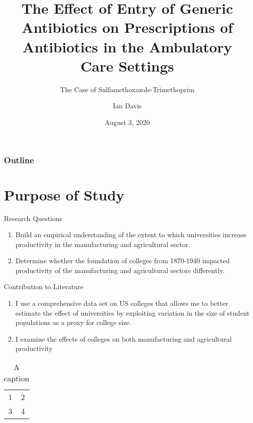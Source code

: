 \documentclass{beamer}
\title{The Effect of Entry of Generic Antibiotics on Prescriptions of Antibiotics in the Ambulatory Care Settings}
\subtitle{The Case of Sulfamethoxazole-Trimethoprim}
\author{Ian Davis}
\institute{Clemson University}
\date{August 3, 2020}
\begin{document}
\begin{frame}
\titlepage
\end{frame}

\begin{frame}
\frametitle{Outline}
\tableofcontents
\end{frame}

\section{Purpose of Study}
\begin{frame}{Research Questions}
\begin{enumerate}
\item Build an empirical understanding of the extent to which  universities increase productivity in the manufacturing and agricultural sector.
\item Determine whether the foundation of colleges from 1870-1940 impacted productivity of the manufacturing and agricultural sectors differently.
\end{enumerate}
\end{frame}

\begin{frame}{Contribution to Literature}
\begin{enumerate}
\item I use a comprehensive data set on US colleges that allows me to better estimate the effect of universities by exploiting variation in the size of student populations as a proxy for college size.
\item I examine the effects of colleges on both manufacturing and agricultural productivity
\end{enumerate}
\end{frame}



\begin{frame} %
\begin{table}[tbp]
\begin{tabular}{cc}
1 & 2 \\
3 & 4
\end{tabular}
\caption{A caption}
\end{table}
\end{frame}
\end{document}

